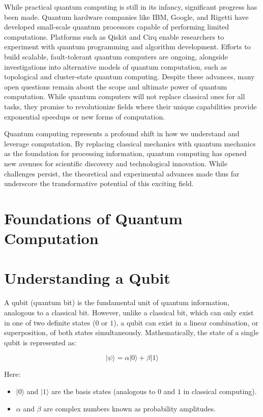 \documentclass[11pt]{article}
\theoremstyle{definition}
\begin{document}
While practical quantum computing is still in its infancy, significant progress has been made. Quantum hardware companies like IBM, Google, and Rigetti have developed small-scale quantum processors capable of performing limited computations. Platforms such as Qiskit and Cirq enable researchers to experiment with quantum programming and algorithm development. Efforts to build scalable, fault-tolerant quantum computers are ongoing, alongside investigations into alternative models of quantum computation, such as topological and cluster-state quantum computing. Despite these advances, many open questions remain about the scope and ultimate power of quantum computation. While quantum computers will not replace classical ones for all tasks, they promise to revolutionize fields where their unique capabilities provide exponential speedups or new forms of computation.

Quantum computing represents a profound shift in how we understand and leverage computation. By replacing classical mechanics with quantum mechanics as the foundation for processing information, quantum computing has opened new avenues for scientific discovery and technological innovation. While challenges persist, the theoretical and experimental advances made thus far underscore the transformative potential of this exciting field.


\section*{Foundations of Quantum Computation}



\section*{Understanding a Qubit}
A qubit (quantum bit) is the fundamental unit of quantum information, analogous to a classical bit. However, unlike a classical bit, which can only exist in one of two definite states ($0$ or $1$), a qubit can exist in a linear combination, or superposition, of both states simultaneously. Mathematically, the state of a single qubit is represented as:

\begin{equation}
|\psi\rangle = \alpha |0\rangle + \beta |1\rangle
\end{equation}

Here:
\begin{itemize}
    \item $|0\rangle$ and $|1\rangle$ are the basis states (analogous to $0$ and $1$ in classical computing).
    \item $\alpha$ and $\beta$ are complex numbers known as probability amplitudes.
\end{itemize}
\end{document}
